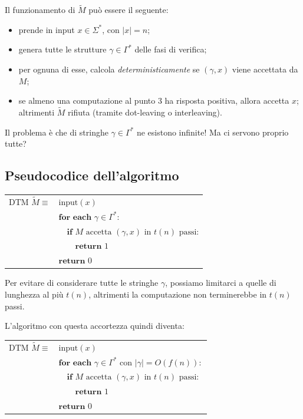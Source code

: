 Il funzionamento di $\widetilde{M}$ può essere il seguente:
\begin{itemize}
    \item prende in input $x \in \Sigma^*$, con $|x| = n$;
    \item genera tutte le strutture $\gamma \in \Gamma^*$ delle fasi di verifica;
    \item per ognuna di esse, calcola \emph{deterministicamente} se $(\gamma, x)$ viene accettata da $M$;
    \item se almeno una computazione al punto 3 ha risposta positiva, allora accetta $x$; altrimenti $\widetilde{M}$ rifiuta (tramite dot-leaving o interleaving).
\end{itemize}

Il problema è che di stringhe $\gamma \in \Gamma^*$ ne esistono infinite! Ma ci servono proprio tutte?

\subsection*{Pseudocodice dell'algoritmo}

\begin{center}
	\begin{tabular}{r|l|}
		\cline{2-2}
		$\text{DTM } \widetilde{M} \equiv$	& $\text{input}(x)$ \\
			& $ \textbf{for each } \gamma \in \Gamma^*:$ \\
											& $\quad \textbf{if } M \text{ accetta } (\gamma, x) \text{ in } t(n) \text{ passi:}$ \\
	  		& $  \quad \quad \textbf{return } 1$ \\
			& $\textbf{return } 0$ \\
		\cline{2-2}
	\end{tabular}
\end{center}

Per evitare di considerare tutte le stringhe $\gamma$, possiamo limitarci a quelle di lunghezza al più $t(n)$, altrimenti la computazione non terminerebbe in $t(n)$ passi.

L’algoritmo con questa accortezza quindi diventa:

\begin{center}
	\begin{tabular}{r|l|}
		\cline{2-2}
		$\text{DTM } \widetilde{M} \equiv$	& $\text{input}(x)$ \\
			& $ \textbf{for each } \gamma \in \Gamma^* \text{ con } |\gamma| = O(f(n)):$ \\
											& $\quad \textbf{if } M \text{ accetta } (\gamma, x) \text{ in } t(n) \text{ passi:}$ \\
	  		& $  \quad \quad \textbf{return } 1$ \\
			& $\textbf{return } 0$ \\
		\cline{2-2}
	\end{tabular}
\end{center}

